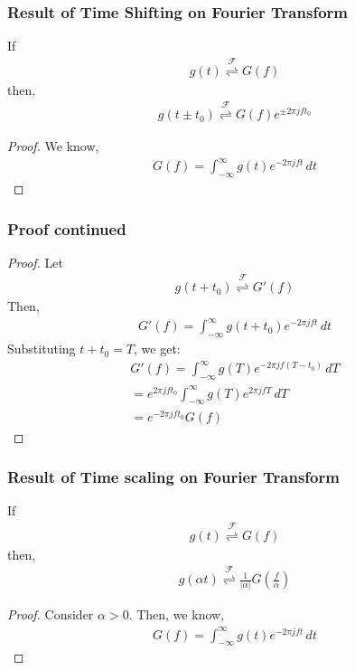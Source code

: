 \documentclass{beamer}
\providecommand{\brak}[1]{\ensuremath{\left(#1\right)}}
\providecommand{\fourier}{\overset{\mathcal{F}}{ \rightleftharpoons}}
\providecommand{\abs}[1]{\left\vert#1\right\vert}
\begin{document}
\begin{frame}[fragile]
\frametitle{Result of Time Shifting on Fourier Transform}

\begin{flushleft}
\begin{lemma}
If 
\begin{align}
    g(t) \fourier G(f)
\end{align}
then,
\begin{align}
    g(t \pm t_0) \fourier G(f)e^{\pm 2\pi j f t_0}
\end{align}
\label{shift}
\end{lemma} 
\begin{proof}
We know, 
\begin{align}
    G(f) = \int_{-\infty}^\infty g(t) e^{-2\pi j ft} \,dt
\end{align}
\end{proof}
\end{flushleft}
\end{frame}


\begin{frame}[fragile]
\frametitle{Proof continued}
\begin{flushleft}

\begin{proof}
Let 
\begin{align}
    g(t + t_0) \fourier G'(f)
\end{align}
Then,
\begin{align}
    G'(f) = \int_{-\infty}^\infty g(t + t_0) e^{-2\pi j ft} \,dt
\end{align}
Substituting $t + t_0 = T$, we get:
\begin{align}
    G'(f) = \int_{-\infty}^\infty g(T) e^{-2\pi j f(T - t_0)} \,dT\\
      =e^{2\pi j ft_0} \int_{-\infty}^\infty g(T) e^{2\pi j fT} \,dT\\
       = e^{-2\pi j ft_0}G(f)
\end{align}
\end{proof}
\end{flushleft}
\end{frame}


\begin{frame}[fragile]
\frametitle{Result of Time scaling on Fourier Transform}
\begin{flushleft}
\begin{lemma}
If 
\begin{align}
    g(t) \fourier G(f)
\end{align}
then,
\begin{align}
    g(\alpha t) \fourier \frac{1}{\abs{\alpha}}G\brak{\frac{f}{\alpha}}
\end{align}
\label{scale}
\end{lemma}
\begin{proof}
Consider $\alpha > 0$. Then, we know, 
\begin{align}
    G(f) = \int_{-\infty}^\infty g(t) e^{-2\pi j ft} \,dt
\end{align}
\end{proof}
\end{flushleft}

\end{frame}
\end{document}
